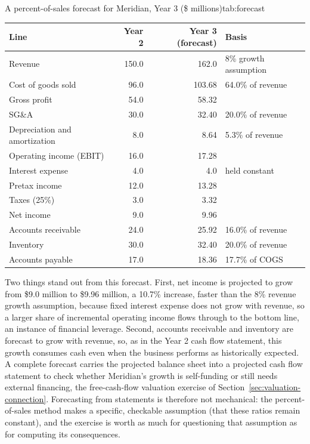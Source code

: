 \documentclass[../ai_in_finance]{subfiles}
\begin{document}
\begin{booktable}[htbp]{A percent-of-sales forecast for Meridian, Year 3 (\$ millions)}{tab:forecast}
\begin{tabular}{lrrl}
\toprule
Line & Year 2 & Year 3 (forecast) & Basis \\
\midrule
Revenue & 150.0 & 162.0 & 8\% growth assumption \\
Cost of goods sold & 96.0 & 103.68 & 64.0\% of revenue \\
Gross profit & 54.0 & 58.32 & \\
SG\&A & 30.0 & 32.40 & 20.0\% of revenue \\
Depreciation and amortization & 8.0 & 8.64 & 5.3\% of revenue \\
Operating income (EBIT) & 16.0 & 17.28 & \\
Interest expense & 4.0 & 4.0 & held constant \\
Pretax income & 12.0 & 13.28 & \\
Taxes (25\%) & 3.0 & 3.32 & \\
Net income & 9.0 & 9.96 & \\
\midrule
Accounts receivable & 24.0 & 25.92 & 16.0\% of revenue \\
Inventory & 30.0 & 32.40 & 20.0\% of revenue \\
Accounts payable & 17.0 & 18.36 & 17.7\% of COGS \\
\bottomrule
\end{tabular}
\end{booktable}

Two things stand out from this forecast. First, net income is projected to grow from \$9.0 million to \$9.96 million, a 10.7\% increase, faster than the 8\% revenue growth assumption, because fixed interest expense does not grow with revenue, so a larger share of incremental operating income flows through to the bottom line, an instance of financial leverage.
Second, accounts receivable and inventory are forecast to grow with revenue, so, as in the Year 2 cash flow statement, this growth consumes cash even when the business performs as historically expected. A complete forecast carries the projected balance sheet into a projected cash flow statement to check whether Meridian's growth is self-funding or still needs external financing, the free-cash-flow valuation exercise of Section~\ref{sec:valuation-connection}.
Forecasting from statements is therefore not mechanical: the percent-of-sales method makes a specific, checkable assumption (that these ratios remain constant), and the exercise is worth as much for questioning that assumption as for computing its consequences.
\end{document}
